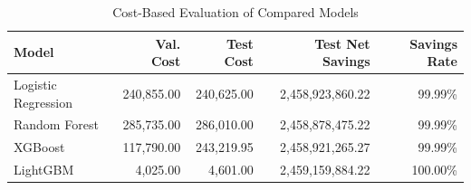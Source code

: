 \begin{table}[H]
\centering
\caption{Cost-Based Evaluation of Compared Models}
\label{tab:cost_based_model_comparison}
\begin{tabular}{lrrrr}
\hline
\textbf{Model} & \textbf{Val. Cost} & \textbf{Test Cost} & \textbf{Test Net Savings} & \textbf{Savings Rate} \\
\hline
Logistic Regression & 240,855.00 & 240,625.00 & 2,458,923,860.22 & 99.99\% \\
Random Forest & 285,735.00 & 286,010.00 & 2,458,878,475.22 & 99.99\% \\
XGBoost & 117,790.00 & 243,219.95 & 2,458,921,265.27 & 99.99\% \\
LightGBM & 4,025.00 & 4,601.00 & 2,459,159,884.22 & 100.00\% \\
\hline
\end{tabular}
\end{table}